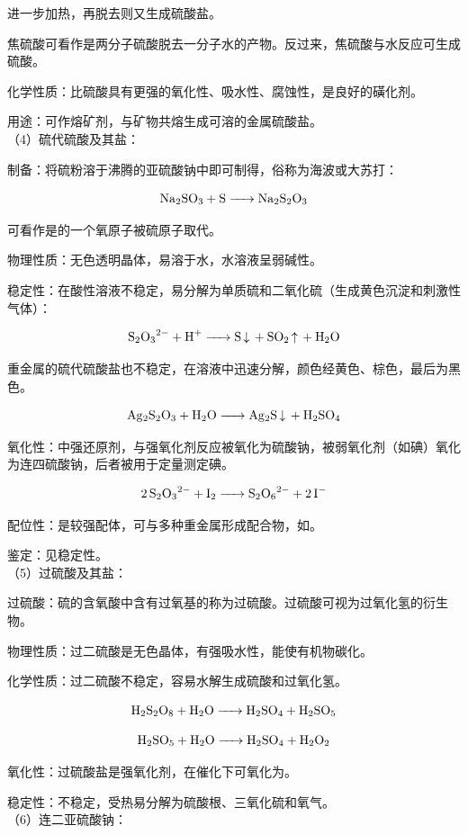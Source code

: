 \documentclass[a4paper,UTF8]{article}
\begin{document}
进一步加热，再脱去则又生成硫酸盐。

焦硫酸可看作是两分子硫酸脱去一分子水的产物。反过来，焦硫酸与水反应可生成硫酸。

化学性质：比硫酸具有更强的氧化性、吸水性、腐蚀性，是良好的磺化剂。

用途：可作熔矿剂，与矿物共熔生成可溶的金属硫酸盐。\\

（4）硫代硫酸及其盐：

制备：将硫粉溶于沸腾的亚硫酸钠中即可制得，俗称为海波或大苏打：

$$ \ce{Na2SO3 + S -> Na2S2O3} $$

可看作是的一个氧原子被硫原子取代。

物理性质：无色透明晶体，易溶于水，水溶液呈弱碱性。

稳定性：在酸性溶液不稳定，易分解为单质硫和二氧化硫（生成黄色沉淀和刺激性气体）：

$$ \ce{S2O3^2- + H+ -> S\ce{v} + SO2\ce{^} + H2O} $$

重金属的硫代硫酸盐也不稳定，在溶液中迅速分解，颜色经黄色、棕色，最后为黑色。

$$ \ce{Ag2S2O3 + H2O -> Ag2S\ce{v} + H2SO4} $$

氧化性：中强还原剂，与强氧化剂反应被氧化为硫酸钠，被弱氧化剂（如碘）氧化为连四硫酸钠，后者被用于定量测定碘。

$$ \ce{2S2O3^2- + I2 -> S2O6^2- + 2I-} $$

配位性：是较强配体，可与多种重金属形成配合物，如。

鉴定：见稳定性。\\

（5）过硫酸及其盐：

过硫酸：硫的含氧酸中含有过氧基的称为过硫酸。过硫酸可视为过氧化氢的衍生物。

物理性质：过二硫酸是无色晶体，有强吸水性，能使有机物碳化。

化学性质：过二硫酸不稳定，容易水解生成硫酸和过氧化氢。

$$ \ce{H2S2O8 + H2O -> H2SO4 + H2SO5} $$

$$ \ce{H2SO5 + H2O -> H2SO4 + H2O2} $$

氧化性：过硫酸盐是强氧化剂，在催化下可氧化为。

稳定性：不稳定，受热易分解为硫酸根、三氧化硫和氧气。\\

（6）连二亚硫酸钠：
\end{document}
